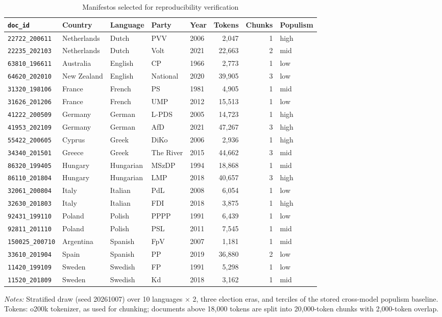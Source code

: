 \begin{table}[ht]
\centering
\caption{Manifestos selected for reproducibility verification}
\label{tab:verify_manifestos}
\footnotesize
\begin{tabular}{lllllrrl}
\toprule
\texttt{doc\_id} & Country & Language & Party & Year & Tokens & Chunks & Populism \\
\midrule
\texttt{22722\_200611} & Netherlands & Dutch & PVV & 2006 & 2{,}047 & 1 & high \\
\texttt{22235\_202103} & Netherlands & Dutch & Volt & 2021 & 22{,}663 & 2 & mid \\
\texttt{63810\_196611} & Australia & English & CP & 1966 & 2{,}773 & 1 & low \\
\texttt{64620\_202010} & New Zealand & English & National & 2020 & 39{,}905 & 3 & low \\
\texttt{31320\_198106} & France & French & PS & 1981 & 4{,}905 & 1 & mid \\
\texttt{31626\_201206} & France & French & UMP & 2012 & 15{,}513 & 1 & low \\
\texttt{41222\_200509} & Germany & German & L-PDS & 2005 & 14{,}723 & 1 & high \\
\texttt{41953\_202109} & Germany & German & AfD & 2021 & 47{,}267 & 3 & high \\
\texttt{55422\_200605} & Cyprus & Greek & DiKo & 2006 & 2{,}936 & 1 & high \\
\texttt{34340\_201501} & Greece & Greek & The River & 2015 & 44{,}662 & 3 & mid \\
\texttt{86320\_199405} & Hungary & Hungarian & MSzDP & 1994 & 18{,}868 & 1 & mid \\
\texttt{86110\_201804} & Hungary & Hungarian & LMP & 2018 & 40{,}657 & 3 & high \\
\texttt{32061\_200804} & Italy & Italian & PdL & 2008 & 6{,}054 & 1 & low \\
\texttt{32630\_201803} & Italy & Italian & FDI & 2018 & 3{,}875 & 1 & high \\
\texttt{92431\_199110} & Poland & Polish & PPPP & 1991 & 6{,}439 & 1 & low \\
\texttt{92811\_201110} & Poland & Polish & PSL & 2011 & 7{,}545 & 1 & mid \\
\texttt{150025\_200710} & Argentina & Spanish & FpV & 2007 & 1{,}181 & 1 & mid \\
\texttt{33610\_201904} & Spain & Spanish & PP & 2019 & 36{,}880 & 2 & low \\
\texttt{11420\_199109} & Sweden & Swedish & FP & 1991 & 5{,}298 & 1 & low \\
\texttt{11520\_201809} & Sweden & Swedish & Kd & 2018 & 3{,}162 & 1 & mid \\
\bottomrule
\end{tabular}
\par\smallskip\parbox{0.95\linewidth}{\scriptsize\textit{Notes:} Stratified draw (seed 20261007) over 10 languages $\times$ 2, three election eras, and terciles of the stored cross-model populism baseline. Tokens: o200k tokenizer, as used for chunking; documents above 18{,}000 tokens are split into 20{,}000-token chunks with 2{,}000-token overlap.}
\end{table}

